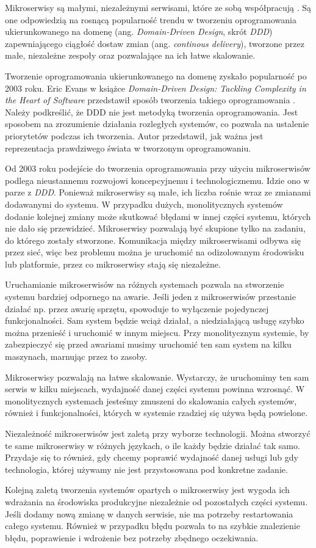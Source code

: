 Mikroserwisy są małymi, niezależnymi serwisami, które ze sobą współpracują \cite{newman}. Są one odpowiedzią na rosnącą popularność trendu w tworzeniu oprogramowania ukierunkowanego na domenę (ang. \textsl{Domain-Driven Design}, skrót \textsl{DDD}) zapewniającego ciągłość dostaw zmian (ang. \textsl{continous delivery}), tworzone przez małe, niezależne zespoły oraz pozwalające na ich łatwe skalowanie. 

Tworzenie oprogramowania ukierunkowanego na domenę zyskało popularność po 2003 roku. Eric Evans w książce \textsl{Domain-Driven Design: Tackling Complexity in the Heart of Software} przedstawił sposób tworzenia takiego oprogramowania  \cite{ddd}. Należy podkreślić, że DDD nie jest metodyką tworzenia oprogramowania. Jest sposobem na zrozumienie działania rozległych systemów, co pozwala na ustalenie priorytetów podczas ich tworzenia. Autor przedstawił, jak ważna jest reprezentacja prawdziwego świata w tworzonym oprogramowaniu. 

Od 2003 roku podejście do tworzenia oprogramowania przy użyciu mikroserwisów podlega nieustannemu rozwojowi koncepcyjnemu i technologicznemu. Idzie ono w parze z \textsl{DDD}. Ponieważ mikroserwisy są małe, ich liczba rośnie wraz ze zmianami dodawanymi do systemu. W przypadku dużych,  monolitycznych systemów dodanie kolejnej zmiany może skutkować błędami w innej części systemu, których nie dało się przewidzieć. Mikroserwisy pozwalają być skupione tylko na zadaniu, do którego zostały stworzone. Komunikacja między mikroserwisami odbywa się przez sieć, więc bez problemu można je uruchomić na odizolowanym środowisku lub platformie, przez co mikroserwisy stają się niezależne. 

Uruchamianie mikroserwisów na różnych systemach pozwala na stworzenie systemu bardziej odpornego na awarie. Jeśli jeden z mikroserwisów przestanie działać np. przez awarię sprzętu, spowoduje to wyłączenie pojedynczej funkcjonalności. Sam system będzie wciąż działał, a niedziałającą usługę szybko można przenieść i uruchomić w innym miejscu. Przy monolitycznym systemie, by zabezpieczyć się przed awariami musimy uruchomić ten sam system na kilku maszynach, marnując przez to zasoby.

Mikroserwisy pozwalają na łatwe skalowanie. Wystarczy, że uruchomimy ten sam serwis w kilku miejscach, wydajność danej części systemu powinna wzrosnąć. W monolitycznych systemach jesteśmy zmuszeni do skalowania całych systemów, również i funkcjonalności, których w systemie rzadziej się używa będą powielone.

Niezależność mikroserwisów jest zaletą przy wyborze technologii. Można stworzyć te same mikroserwisy w różnych językach, o ile każdy będzie działać tak samo. Przydaje się to również, gdy chcemy poprawić wydajność danej usługi lub gdy technologia, której używamy nie jest przystosowana pod konkretne zadanie. 

Kolejną zaletą tworzenia systemów opartych o mikroserwisy jest wygoda ich wdrażania na środowiska produkcyjne niezależnie od pozostałych części systemu. Jeśli dodamy nową zmianę w danych serwisie, nie ma potrzeby restartowania całego systemu. Również w przypadku błędu pozwala to na szybkie znalezienie błędu, poprawienie i wdrożenie bez potrzeby zbędnego oczekiwania. 